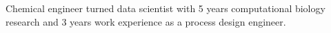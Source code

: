 

\begin{cvparagraph}


Chemical engineer turned data scientist with 5 years computational biology research and 3 years work experience as a process design engineer.

\vspace{-2.0mm}

\end{cvparagraph}
